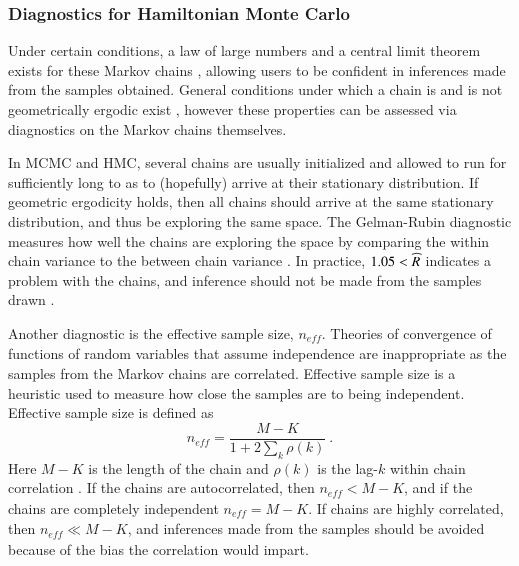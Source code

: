 \subsubsection{Diagnostics for Hamiltonian Monte Carlo}

Under certain conditions, a law of large numbers and a central limit theorem exists for these Markov chains \cite{livingstone2016geometric, betancourt2017robust}, allowing users to be confident in inferences made from the samples obtained.  General conditions under which a chain is and is not geometrically ergodic exist \cite{livingstone2016geometric}, however these properties can be assessed via diagnostics on the Markov chains themselves.

In MCMC and HMC, several chains are usually initialized and allowed to run for sufficiently long to as to (hopefully) arrive at their stationary distribution.  If geometric ergodicity holds, then all chains should arrive at the same stationary distribution, and thus be exploring the same space.  The Gelman-Rubin diagnostic  measures how well the chains are exploring the space by comparing the within chain variance to the between chain variance \cite{gelman2013bayesian}.  In practice, $ 1.05<\widehat{R} $ indicates a problem with the chains, and inference should not be made from the samples drawn \cite{betancourt2017robust}.

Another diagnostic is the effective sample size, $ n_{\mathit{eff}} $.  Theories of convergence of functions of random variables that assume independence are inappropriate as the samples from the Markov chains are correlated.  Effective sample size is a heuristic used to measure how close the samples are to being independent.  Effective sample size is defined as
%
\[ n_{\mathit{eff}} = \dfrac{M-K}{1+ 2\displaystyle\sum_k \rho(k)} \>. \]
%
Here $ M-K $ is the length of the chain and $ \rho(k) $ is the lag-$k$ within chain correlation \cite{gelman2013bayesian,kass1998markov}.  If the chains are autocorrelated, then $n_{\mathit{eff}} <M-K$, and if the chains are completely independent $n_{\mathit{eff}} = M-K$. If chains are highly correlated, then $n_{\mathit{eff}} \ll M-K$, and inferences made from the samples should be avoided because of the bias the correlation would impart.